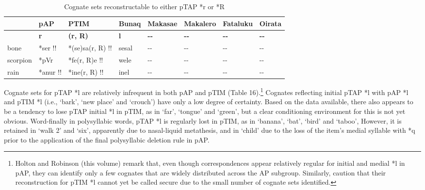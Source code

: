 \begin{table}\centering\tiny


\begin{tabular}{llllllll}
\hline&pAP&PTIM&Bunaq&Makasae&Makalero&Fataluku&Oirata\\\hline&{\bfseries *r}&{\bfseries *(r, R)}&{\bfseries l}&{\bfseries {}-{}-}&{\bfseries {}-{}-}&{\bfseries {}-{}-}&{\bfseries {}-{}-}\\\hline
bone&*ser !!&*(se)sa(r, R) !!&sesal&{}-{}-&{}-{}-&{}-{}-&{}-{}-\\
scorpion&*pVr&*fe(r, R)e !!&wele&{}-{}-&{}-{}-&{}-{}-&{}-{}-\\
rain&*anur !!&*ine(r, R) !!&inel&{}-{}-&{}-{}-&{}-{}-&{}-{}-\\\hline

\end{tabular}

\caption{Cognate sets reconstructable to either pTAP *r or *R}
\end{table}
Cognate sets for pTAP *l are relatively infrequent in both pAP and pTIM (Table 16).\footnote{\textstylefootnotereference{ } Holton and Robinson (this volume) remark that, even though correspondences appear relatively regular for initial and medial *l in pAP, they can identify only a few cognates that are widely distributed across the AP subgroup. Similarly, \citet{SchapperEtAl2012} caution that their reconstruction for pTIM *l cannot yet be called secure due to the small number of cognate sets identified.} Cognates reflecting initial pTAP *l with pAP *l and pTIM *l (i.e., `bark', `new place' and `crouch') have only a low degree of certainty. Based on the data available, there also appears to be a tendency to lose pTAP initial *l in pTIM, as in `far', `tongue' and `green', but a clear conditioning environment for this is not yet obvious. Word-finally in polysyllabic words, pTAP *l is regularly lost in pTIM, as in `banana', `bat', `bird' and `taboo', However, it is retained in `walk 2' and `six', apparently due
to nasal-liquid metathesis, and in `child' due to the loss of the item's medial syllable with *q prior to the application of the final polysyllabic deletion rule in pAP.



